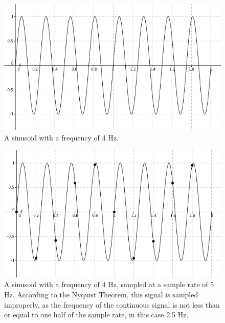 \documentclass[12pt,twoside]{report}
\begin{document}
\begin{figure}[b!]

  \centering

  \includegraphics[scale=0.5]{img/orig}

  \caption{A sinusoid with a frequency of 4 Hz.}

  \label{fig:orig}

\end{figure}

\begin{figure}

  \centering

  \includegraphics[scale=0.5]{img/sampled}

  \caption{A sinusoid with a frequency of 4 Hz, sampled at a sample rate of 5 Hz. According to the Nyquist Theorem, this signal is sampled improperly, as the frequency of the continuous signal is not less than or equal to one half of the sample rate, in this case 2.5 Hz. }

  \label{fig:sampled}

\end{figure}
\end{document}
